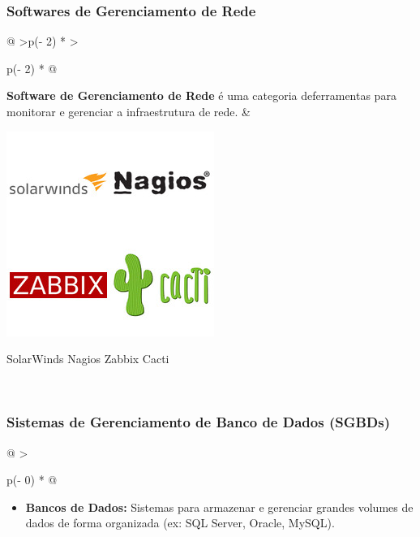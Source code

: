 \documentclass[
]{book}
\providecommand{\tightlist}{%
  \setlength{\itemsep}{0pt}\setlength{\parskip}{0pt}}
\begin{document}
\subsubsection{Softwares de Gerenciamento de Rede}\label{softwares-de-gerenciamento-de-rede}

\begin{longtable}[]{@{}
  >{\centering\arraybackslash}p{(\columnwidth - 2\tabcolsep) * }
  >{\raggedright\arraybackslash}p{(\columnwidth - 2\tabcolsep) * }@{}}
\toprule\noalign{}
\endhead
\bottomrule\noalign{}
\endlastfoot
\textbf{Software de Gerenciamento de Rede} é uma categoria deferramentas para monitorar e gerenciar a infraestrutura de rede. & \begin{minipage}[t]{\linewidth}\raggedright
\begin{center}
\includegraphics{images/InfraEstrutura/software/monitoramento.jpg}

SolarWinds Nagios Zabbix Cacti
\end{center}
\end{minipage} \\
\end{longtable}

\subsubsection{Sistemas de Gerenciamento de Banco de Dados (SGBDs)}\label{sistemas-de-gerenciamento-de-banco-de-dados-sgbds}

\begin{longtable}[]{@{}
  >{\raggedright\arraybackslash}p{(\columnwidth - 0\tabcolsep) * }@{}}
\toprule\noalign{}
\endhead
\bottomrule\noalign{}
\endlastfoot
\begin{minipage}[t]{\linewidth}\raggedright
\begin{itemize}
\tightlist
\item
  \textbf{Bancos de Dados:} Sistemas para armazenar e gerenciar grandes volumes de dados de forma organizada (ex: SQL Server, Oracle, MySQL).
\end{itemize}
\end{minipage} \\
\end{longtable}
\end{document}
